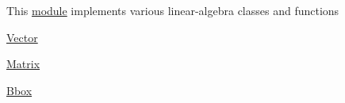 This \hyperlink{group___linalg_module}{module} implements various linear-\/algebra classes and functions


\begin{DoxyItemize}
\item \hyperlink{structcugar_1_1_vector}{Vector}
\item \hyperlink{structcugar_1_1_matrix}{Matrix}
\item \hyperlink{structcugar_1_1_bbox}{Bbox} 
\end{DoxyItemize}